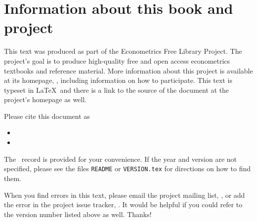 \section{Information about this book and project}

This text was produced as part of the Econometrics Free Library
Project.  The project's goal is to produce high-quality free and
open access econometrics textbooks and reference material.  More
information about this project is available at its homepage,
\homepage, including information on how
to participate.  This text is typeset in \LaTeX\ and there is a link
to the source of the document at the project's homepage as well.

Please cite this document as
\begin{itemize}
\item[] 
\item[] 
\end{itemize}
The \BibTeX\ record is provided for your convenience.
If the year and version are not specified, please see the files
\texttt{README} or \texttt{VERSION.tex} for directions on how to
find them.

When you find errors in this text, please email the project mailing
list, \maillist, or add the error in the project issue tracker,
\bugtrack.  It would be helpful if you could refer to the version
number listed above as well.  Thanks!
